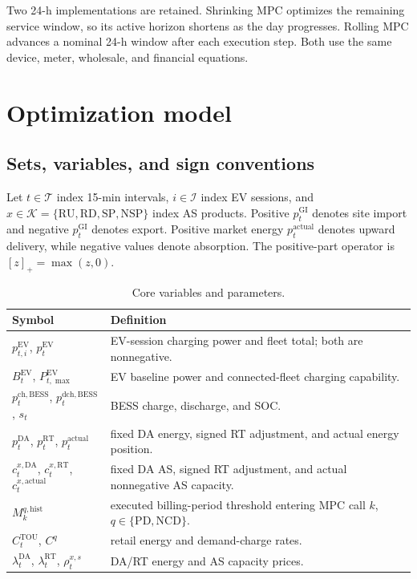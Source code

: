 \documentclass[final,5p,times]{elsarticle}
\newcommand{\EV}{\mathrm{EV}}
\newcommand{\BESS}{\mathrm{BESS}}
\newcommand{\DA}{\mathrm{DA}}
\newcommand{\RT}{\mathrm{RT}}
\newcommand{\GI}{\mathrm{GI}}
\newcommand{\TOU}{\mathrm{TOU}}
\newcommand{\PD}{\mathrm{PD}}
\newcommand{\NCD}{\mathrm{NCD}}
\newcommand{\RU}{\mathrm{RU}}
\newcommand{\RD}{\mathrm{RD}}
\newcommand{\SP}{\mathrm{SP}}
\newcommand{\NSP}{\mathrm{NSP}}
\newcommand{\ch}{\mathrm{ch}}
\newcommand{\dch}{\mathrm{dch}}
\newcommand{\actual}{\mathrm{actual}}
\newcommand{\hist}{\mathrm{hist}}
\newcommand{\calT}{\mathcal{T}}
\newcommand{\calI}{\mathcal{I}}
\newcommand{\calK}{\mathcal{K}}
\newcommand{\pos}[1]{\left[#1\right]_{+}}
\begin{document}
Two 24-h implementations are retained. Shrinking MPC optimizes the remaining service window, so its active horizon shortens as the day progresses. Rolling MPC advances a nominal 24-h window after each execution step. Both use the same device, meter, wholesale, and financial equations.

\section{Optimization model}
\label{sec:model}

\subsection{Sets, variables, and sign conventions}
Let $t\in\calT$ index 15-min intervals, $i\in\calI$ index EV sessions, and
$x\in\calK=\{\RU,\RD,\SP,\NSP\}$ index AS products. Positive
$p_t^{\GI}$ denotes site import and negative $p_t^{\GI}$ denotes export. Positive
market energy $p_t^{\actual}$ denotes upward delivery, while negative values
denote absorption. The positive-part operator is $\pos{z}=\max(z,0)$.

\begin{table}[!t]
\centering
\caption{Core variables and parameters.}
\label{tab:notation}
\scriptsize
\begin{tabularx}{\textwidth}{@{}p{}X@{}}
\toprule
Symbol & Definition \\
\midrule
$p_{t,i}^{\EV}$, $p_t^{\EV}$ & EV-session charging power and fleet total; both are nonnegative.\\
$B_t^{\EV}$, $P_{t,\max}^{\EV}$ & EV baseline power and connected-fleet charging capability.\\
$p_t^{\ch,\BESS}$, $p_t^{\dch,\BESS}$, $s_t$ & BESS charge, discharge, and SOC.\\
$p_t^{\DA}$, $p_t^{\RT}$, $p_t^{\actual}$ & fixed DA energy, signed RT adjustment, and actual energy position.\\
$c_t^{x,\DA}$, $c_t^{x,\RT}$, $c_t^{x,\actual}$ & fixed DA AS, signed RT adjustment, and actual nonnegative AS capacity.\\
$M_k^{q,\hist}$ & executed billing-period threshold entering MPC call $k$, $q\in\{\PD,\NCD\}$.\\
$C_t^{\TOU}$, $C^q$ & retail energy and demand-charge rates.\\
$\lambda_t^{\DA}$, $\lambda_t^{\RT}$, $\rho_t^{x,s}$ & DA/RT energy and AS capacity prices.\\
\bottomrule
\end{tabularx}
\end{table}
\end{document}
